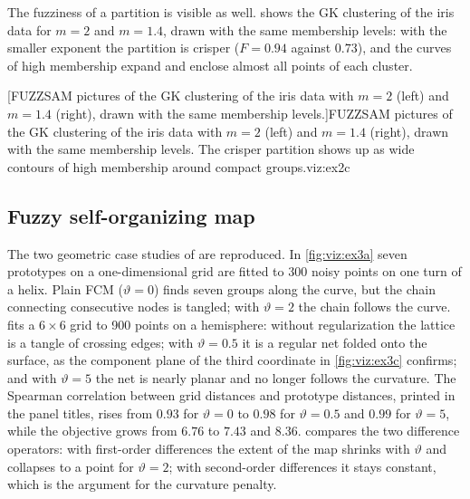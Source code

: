 The fuzziness of a partition is visible as well.  shows the GK clustering of the iris data for $m=2$ and $m=1.4$, drawn with the same membership levels: with the smaller exponent the partition is crisper ($F=0.94$ against $0.73$), and the curves of high membership expand and enclose almost all points of each cluster.

[FUZZSAM pictures of the GK clustering of the iris data with $m=2$ (left) and $m=1.4$ (right), drawn with the same membership levels.]{FUZZSAM pictures of the GK clustering of the iris data with $m=2$ (left) and $m=1.4$ (right), drawn with the same membership levels. The crisper partition shows up as wide contours of high membership around compact groups.}{viz:ex2c}

\subsection{Fuzzy self-organizing map}

The two geometric case studies of \cite{migaly:2003:fsom} are reproduced. In \cref{fig:viz:ex3a} seven prototypes on a one-dimensional grid are fitted to 300 noisy points on one turn of a helix. Plain FCM ($\vartheta=0$) finds seven groups along the curve, but the chain connecting consecutive nodes is tangled; with $\vartheta=2$ the chain follows the curve.  fits a $6\times6$ grid to 900 points on a hemisphere: without regularization the lattice is a tangle of crossing edges; with $\vartheta=0.5$ it is a regular net folded onto the surface, as the component plane of the third coordinate in \cref{fig:viz:ex3c} confirms; and with $\vartheta=5$ the net is nearly planar and no longer follows the curvature. The Spearman correlation between grid distances and prototype distances, printed in the panel titles, rises from $0.93$ for $\vartheta=0$ to $0.98$ for $\vartheta=0.5$ and $0.99$ for $\vartheta=5$, while the objective grows from $6.76$ to $7.43$ and $8.36$.  compares the two difference operators: with first-order differences the extent of the map shrinks with $\vartheta$ and collapses to a point for $\vartheta=2$; with second-order differences it stays constant, which is the argument for the curvature penalty.

